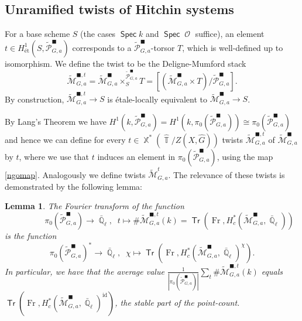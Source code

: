 \documentclass{article}
\DeclareMathOperator{\A}{\mathsf{A}}
\DeclareMathOperator{\id}{id}
\DeclareMathOperator{\Xb}{\mathbb{X}}
\DeclareMathOperator{\Tb}{\mathbb{T}}
\newcommand{\Mc}{\mathcal{M}}
\DeclareMathOperator{\Tr}{\mathsf{Tr}}
\DeclareMathOperator{\Fr}{Fr}
\DeclareMathOperator{\Spec}{\mathsf{Spec}}
\DeclareMathOperator{\Oo}{\mathcal{O}}
\DeclareMathOperator{\Qb}{\mathbb{Q}}
\newcommand{\wpc}{\widetilde{\mathcal{P}} }
\newcommand{\wmc}{\widetilde{\Mc} }
\newcommand{\wac}{\widetilde{\A} }
\theoremstyle{definition}
\theoremstyle{plain}
\newtheorem{lemma}[definition]{Lemma}
\begin{document}
%

\subsection{Unramified twists of Hitchin systems}

For a base scheme $S$ (the cases $\Spec k$ and $\Spec \Oo$ suffice), an element $t \in H^1_{\text{\'et}}(S,\wpc_{G,a}^{\blacksquare})$ corresponds to a $\wpc_{G,a}^{\blacksquare}$-torsor $T$, which is well-defined up to isomorphism. We define the twist to be the Deligne-Mumford stack
$$\wmc_{G,a}^{\blacksquare,t} = \wmc_{G,a}^{\blacksquare} \times_S^{\wpc_{G,a}^{\blacksquare}} T = [(\wmc_{G,a}^{\blacksquare} \times T) / {\wpc_{G,a}^{\blacksquare}}].$$
By construction, $\wmc_{G,a}^{\blacksquare,t} \to S$ is \'etale-locally equivalent to $\wmc_{G,a}^{\blacksquare} \to S$. 


By Lang's Theorem we have $H^1(k,\wpc_{G,a}^\blacksquare) = H^1(k,\pi_0(\wpc_{G,a}^\blacksquare)) \cong \pi_0(\wpc_{G,a}^\blacksquare)$ and hence we can define for every $t \in \Xb^*(\widehat{\Tb}/Z(X,\widehat{G}))$ twists $\wmc_{G,a}^{\blacksquare,t}$ of $\wmc_{G,a}^{\blacksquare}$ by $t$, where we use that $t$ induces an element in $\pi_0(\wpc_{G,a}^\blacksquare)$, using the map \eqref{ngomap}. Analogously we define twists $\wmc_{G,a}^t$. The relevance of these twists is demonstrated by the following lemma:

\begin{lemma} \label{Fourier}
The Fourier transform of the function 
$$\qquad \qquad \ \pi_0(\wpc_{G,a}^{\blacksquare}) \to \bar{\Qb}_{\ell}, \; \;t \mapsto \#\wmc_{G,a}^{\blacksquare,t}(k) = \Tr(\Fr, H_c^*(\wmc_{G,a}^{\blacksquare},\bar{\Qb}_{\ell}))$$ is the function
$$\pi_0(\wpc_{G,a}^{\blacksquare})^* \to \bar{\Qb}_{\ell},\; \; \chi \mapsto \Tr(\Fr, H^*_c(\wmc_{G,a}^{\blacksquare},\bar{\Qb}_{\ell})^{\chi}).$$
In particular, we have that the average value  $\frac{1}{|\pi_0(\wpc_{G,a}^{\blacksquare})|} \sum_{t} \#\wmc_{G,a}^{\blacksquare,t}(k)$ equals $\Tr(\Fr, H_c^*(\wmc_{G,a}^{\blacksquare},\bar{\Qb}_{\ell})^{\id})$, the stable part of the point-count.
\end{lemma}
\end{document}
